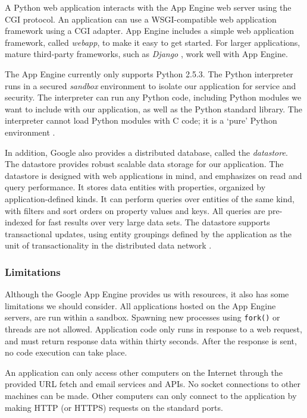 A Python web application interacts with the App Engine web server using the CGI
protocol. An application can use a WSGI-compatible web application framework
using a CGI adapter. App Engine includes a simple web application framework,
called \emph{webapp}, to make it easy to get started. For larger applications,
mature third-party frameworks, such as \emph{Django} \cite{django-www}, work
well with App Engine.

The App Engine currently only supports Python 2.5.3. The Python interpreter runs
in a secured \emph{sandbox} environment to isolate our application for service
and security. The interpreter can run any Python code, including Python modules we
want to  include with our application, as well as the Python standard library.
The interpreter cannot load Python modules with C code; it is a `pure' Python
environment \cite{app-engine-sandbox}.

In addition, Google also provides a distributed database, called the
\emph{datastore}. The datastore provides robust scalable data storage for our
application. The datastore is designed with web applications in mind, and
emphasizes on read and query performance. It stores data entities with
properties, organized by application-defined kinds. It can perform queries over entities of
the same kind, with filters and sort orders on property values and keys. All
queries are pre-indexed for fast results over very large data sets. The datastore
supports transactional updates, using entity groupings defined by the application
as the unit of transactionality in the distributed data network
\cite{app-engine-datastore}.

\subsubsection{Limitations}
Although the Google App Engine provides us with resources, it also has some
limitations we should consider. All applications hosted on the App Engine
servers, are run within a sandbox. Spawning new processes using \texttt{fork()}
or threads are not allowed. Application code only runs in response to a web
request, and must return response data within thirty seconds. After the response
is sent, no code execution can take place.

An application can only access other computers on the Internet through the
provided URL fetch and email services and APIs. No socket connections to other
machines can be made. Other computers can only connect to the application by
making HTTP (or HTTPS) requests on the standard ports.

